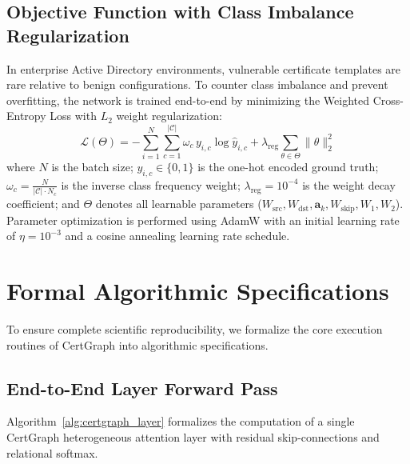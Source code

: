 \subsection{Objective Function with Class Imbalance Regularization}
In enterprise Active Directory environments, vulnerable certificate templates are rare relative to benign configurations. To counter class imbalance and prevent overfitting, the network is trained end-to-end by minimizing the Weighted Cross-Entropy Loss with $L_2$ weight regularization:
\begin{equation}
\mathcal{L}(\Theta) = - \sum_{i=1}^N \sum_{c=1}^{|\mathcal{C}|} \omega_c \, y_{i, c} \log \hat{y}_{i, c} + \lambda_{\text{reg}} \sum_{\theta \in \Theta} \|\theta\|_2^2
\end{equation}
where $N$ is the batch size; $y_{i, c} \in \{0, 1\}$ is the one-hot encoded ground truth; $\omega_c = \frac{N}{|\mathcal{C}| \cdot N_c}$ is the inverse class frequency weight; $\lambda_{\text{reg}} = 10^{-4}$ is the weight decay coefficient; and $\Theta$ denotes all learnable parameters ($W_{\text{src}}, W_{\text{dst}}, \mathbf{a}_k, W_{\text{skip}}, W_1, W_2$). Parameter optimization is performed using AdamW with an initial learning rate of $\eta = 10^{-3}$ and a cosine annealing learning rate schedule.

\section{Formal Algorithmic Specifications}
To ensure complete scientific reproducibility, we formalize the core execution routines of CertGraph into algorithmic specifications.

\subsection{End-to-End Layer Forward Pass}
Algorithm~\ref{alg:certgraph_layer} formalizes the computation of a single CertGraph heterogeneous attention layer with residual skip-connections and relational softmax.

